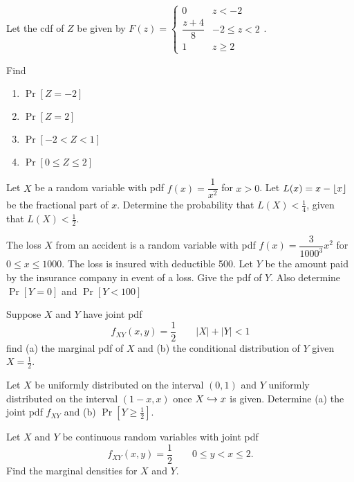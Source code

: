 \documentclass[../main.tex]{subfiles}
\begin{document}
\begin{example}
	Let the cdf of $Z$ be given by $F(z) = \begin{cases} 0 & z<-2 \\ \dfrac{z+4}{8} & -2 \leq z < 2 \\
	1 & z \geq 2\end{cases}$.
	
	 Find
	\begin{enumerate}
		\setlength{\itemsep}{-0.5ex}
		\item $\Pr[Z=-2]$
		\item $\Pr[Z=2]$
		\item $\Pr[-2 < Z < 1]$
		\item $\Pr[0 \leq Z \leq 2]$
	\end{enumerate}
\end{example}

\begin{example}
	Let $X$ be a random variable with pdf $f(x) = \dfrac{1}{x^2}$ for $x>0$. 
	Let $L(x) = x - \lfloor x\rfloor$ be the fractional part of $x$. Determine the
	probability that $L(X) < \frac14$, given that $L(X) < \frac12$.
\end{example}

\begin{example}
	The loss $X$ from an accident is a random variable with pdf $f(x) = \dfrac{3}{1000^3}x^2$ for $0 \leq x \leq 1000$. The loss is insured with
	deductible 500. Let $Y$ be the amount paid by the insurance company in event
	of a loss. Give the pdf of $Y$. Also determine $\Pr[Y=0]$ and $\Pr[Y<100]$
\end{example}

\begin{example}
	Suppose $X$ and $Y$ have joint pdf
	$$f_{XY}(x,y) = \dfrac{1}{2} \qquad |X| + |Y| < 1$$
	find (a) the marginal pdf of $X$ and (b) the conditional distribution of $Y$
	given $X = \frac12$.
\end{example}

\begin{example}
	Let $X$ be uniformly distributed on the interval $(0,1)$ and $Y$
	uniformly distributed on the interval $(1-x,x)$ once $X \hookrightarrow x$ is given.
	Determine (a) the joint pdf $f_{XY}$ and (b) $\Pr[Y \geq \frac12]$.
\end{example}

\begin{example}
	Let $X$ and $Y$ be continuous random variables with joint pdf
	$$f_{XY}(x,y) = \dfrac{1}{2} \qquad 0\leq y <x \leq 2.$$
	Find the marginal densities for $X$ and $Y$.
\end{example}
\end{document}

